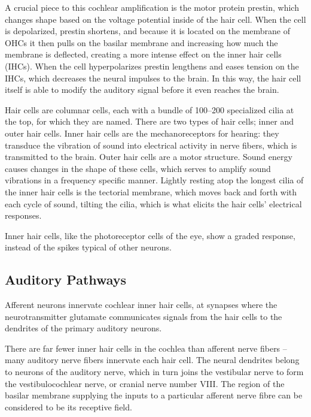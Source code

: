 A crucial piece to this cochlear amplification is the motor protein prestin, which changes shape based on the voltage potential inside of the hair cell. When the cell is depolarized, prestin shortens, and because it is located on the membrane of OHCs it then pulls on the basilar membrane and increasing how much the membrane is deflected, creating a more intense effect on the inner hair cells (IHCs). When the cell hyperpolarizes prestin lengthens and eases tension on the IHCs, which decreases the neural impulses to the brain. In this way, the hair cell itself is able to modify the auditory signal before it even reaches the brain.

Hair cells are columnar cells, each with a bundle of 100--200 specialized cilia at the top, for which they are named. There are two types of hair cells; inner and outer hair cells. Inner hair cells are the mechanoreceptors for hearing: they transduce the vibration of sound into electrical activity in nerve fibers, which is transmitted to the brain. Outer hair cells are a motor structure. Sound energy causes changes in the shape of these cells, which serves to amplify sound vibrations in a frequency specific manner. Lightly resting atop the longest cilia of the inner hair cells is the tectorial membrane, which moves back and forth with each cycle of sound, tilting the cilia, which is what elicits the hair cells' electrical responses.

Inner hair cells, like the photoreceptor cells of the eye, show a graded response, instead of the spikes typical of other neurons.

\hypertarget{auditory-pathways}{%
\subsection{Auditory Pathways}\label{auditory-pathways}}

Afferent neurons innervate cochlear inner hair cells, at synapses where the neurotransmitter glutamate communicates signals from the hair cells to the dendrites of the primary auditory neurons.

There are far fewer inner hair cells in the cochlea than afferent nerve fibers -- many auditory nerve fibers innervate each hair cell. The neural dendrites belong to neurons of the auditory nerve, which in turn joins the vestibular nerve to form the vestibulocochlear nerve, or cranial nerve number VIII. The region of the basilar membrane supplying the inputs to a particular afferent nerve fibre can be considered to be its receptive field.


